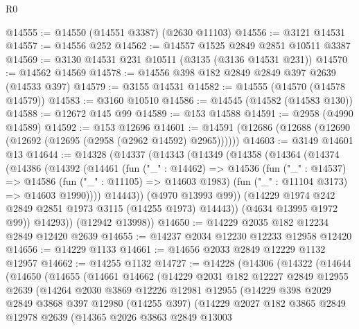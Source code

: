 \begin{lexlean}{R0}
\begin{coremodule}
@14555 := @14550 (@14551 @3387) (@2630 @11103)
@14556 := @3121 @14531
@14557 := @14556 @252
@14562 := @14557 @1525 @2849 @2851 @10511 @3387
@14569 := @3130 @14531 @231 @10511 (@3135 (@3136 @14531 @231))
@14570 := @14562 @14569
@14578 := @14556 @398 @182 @2849 @2849 @397 @2639 (@14533 @397)
@14579 := @3155 @14531
@14582 := @14555 (@14570 (@14578 @14579))
@14583 := @3160 @10510
@14586 := @14545 (@14582 (@14583 @130))
@14588 := @12672 @145 @99
@14589 := @153 @14588
@14591 := @2958 (@4990 @14589)
@14592 := @153 @12696
@14601 := @14591 (@12686 (@12688 (@12690 (@12692 (@12695 (@2958 (@2962 @14592) @2965))))))
@14603 := @3149 @14601 @13
@14644 := @14328
    (@14337
      (@14343
        (@14349
          (@14358
            (@14364
              (@14374
                (@14386
                  (@14392
                    (@14461
                      (fun ("_" : @14462) =>
                      @14536
                        (fun ("_" : @14537) =>
                        @14586
                          (fun ("_" : @11105) => @14603 @1983)
                          (fun ("_" : @11104 @3173) => @14603 @1990))))
                    @14443))
                (@4970 @13993 @99))
              (@14229 @1974 @242 @2849 @2851 @1973 @3115 (@14255 @1973) @14443))
            (@4634 @13995 @1972 @99))
          @14293))
      (@12942 @13998))
@14650 := @14229 @2035 @182 @12234 @2849 @12420 @2639
@14655 := @14237 @2034 @12230 @12233 @12958 @12420
@14656 := @14229 @1133
@14661 := @14656 @2033 @2849 @12229 @1132 @12957
@14662 := @14255 @1132
@14727 := @14228
    (@14306
      (@14322
        (@14644
          (@14650
            (@14655
              (@14661
                @14662
                (@14229
                  @2031
                  @182
                  @12227
                  @2849
                  @12955
                  @2639
                  (@14264
                    @2030
                    @3869
                    @12226
                    @12981
                    @12955
                    (@14229
                      @398
                      @2029
                      @2849
                      @3868
                      @397
                      @12980
                      (@14255 @397)
                      (@14229
                        @2027
                        @182
                        @3865
                        @2849
                        @12978
                        @2639
                        (@14365
                          @2026
                          @3863
                          @2849
                          @13003

\end{coremodule}
\end{lexlean}
